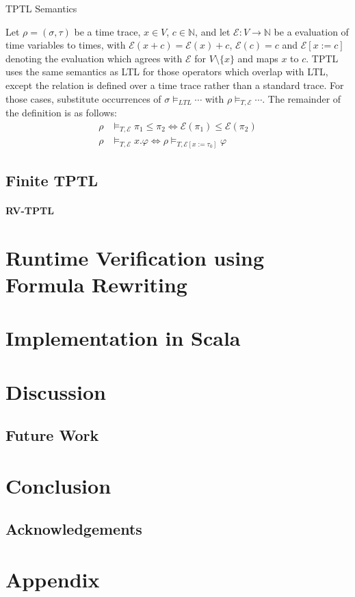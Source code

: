 \documentclass[a4paper]{article}
\begin{document}
\begin{defn}{TPTL Semantics}
  \newcommand{\eval}{\mathcal{E}}

  Let $\rho = (\sigma,\tau)$ be a time trace, $x\in V$, $c\in\mathbb{N}$, and let $\eval:V\to\mathbb{N}$ be a evaluation of time variables to times, with $\eval(x + c) = \eval(x) + c$, $\eval(c) = c$ and $\eval[x:=c]$ denoting the evaluation which agrees with $\eval$ for $V\setminus\{x\}$ and maps $x$ to $c$.
  TPTL uses the same semantics as LTL for those operators which overlap with LTL, except the relation is defined over a time trace rather than a standard trace. For those cases, substitute occurrences of $\sigma\vDash_{LTL}\cdots$ with $\rho\vDash_{T,\eval}\cdots$. The remainder of the definition is as follows:
  \begin{align*}
    \rho&\vDash_{T,\eval}\pi_1\leq\pi_2 \iff \eval(\pi_1)\leq\eval(\pi_2)\\
    \rho&\vDash_{T,\eval} x.\varphi \iff \rho\vDash_{T,\eval[x:=\tau_0]}\varphi
  \end{align*}
\end{defn}

\subsection{Finite TPTL}
\paragraph{RV-TPTL}
\section{Runtime Verification using Formula Rewriting}
\section{Implementation in Scala}

\section{Discussion}
\subsection{Future Work}
\section{Conclusion}
\subsection{Acknowledgements}

\nocite{*}
\printbibliography{}
\newpage
\section{Appendix}\label{appendix}
\end{document}
